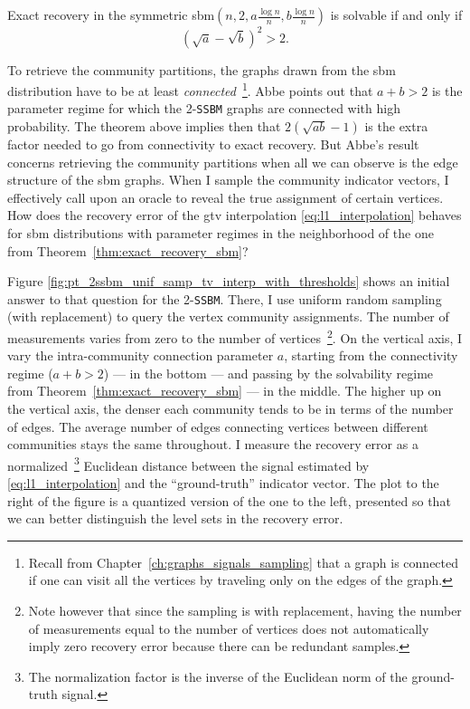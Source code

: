 \begin{theorem}
    Exact recovery in the symmetric \acrshort{sbm}$\left(n, 2, a \frac{\log n}{n}, b \frac{\log n}{n}\right)$ is solvable if and only if
    \begin{equation}
        \left(\sqrt{a} - \sqrt{b}\right)^2 > 2.
    \end{equation}
    \label{thm:exact_recovery_sbm}
\end{theorem}

To retrieve the community partitions, the graphs drawn from the \acrshort{sbm} distribution have to be at least \emph{connected}~\footnote{Recall from Chapter~\ref{ch:graphs_signals_sampling} that a graph is connected if one can visit all the vertices by traveling only on the edges of the graph.}. Abbe \cite{abbe2018} points out that $a + b > 2$ is the parameter regime for which the 2-\texttt{SSBM} graphs are connected with high probability. The theorem above implies then that $2(\sqrt{ab} - 1)$ is the extra factor needed to go from connectivity to exact recovery. But Abbe's result concerns retrieving the community partitions when all we can observe is the edge structure of the \acrshort{sbm} graphs. When I sample the community indicator vectors, I effectively call upon an oracle to reveal the true assignment of certain vertices. How does the recovery error of the \acrshort{gtv} interpolation \eqref{eq:l1_interpolation} behaves for \acrshort{sbm} distributions with parameter regimes in the neighborhood of the one from Theorem~\ref{thm:exact_recovery_sbm}?

Figure \ref{fig:pt_2ssbm_unif_samp_tv_interp_with_thresholds} shows an initial answer to that question for the 2-\texttt{SSBM}. There, I use uniform random sampling (with replacement) to query the vertex community assignments. The number of measurements varies from zero to the number of vertices~\footnote{Note however that since the sampling is with replacement, having the number of measurements equal to the number of vertices does not automatically imply zero recovery error because there can be redundant samples.}. On the vertical axis, I vary the intra-community connection parameter $a$, starting from the connectivity regime ($a + b > 2$) --- in the bottom --- and passing by the solvability regime from Theorem~\ref{thm:exact_recovery_sbm} --- in the middle. The higher up on the vertical axis, the denser each community tends to be in terms of the number of edges. The average number of edges connecting vertices between different communities stays the same throughout. I measure the recovery error as a normalized~\footnote{The normalization factor is the inverse of the Euclidean norm of the ground-truth signal.} Euclidean distance between the signal estimated by \eqref{eq:l1_interpolation} and the ``ground-truth'' indicator vector. The plot to the right of the figure is a quantized version of the one to the left, presented so that we can better distinguish the level sets in the recovery error.


